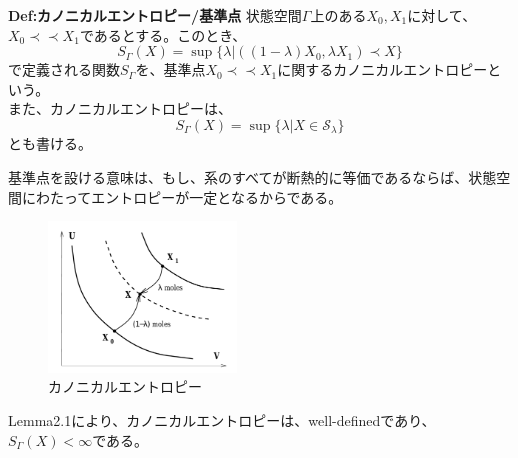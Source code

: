 \documentclass[a4paper,11pt]{jsarticle}
\begin{document}
\begin{itembox}[l]{\textbf{Def:カノニカルエントロピー/基準点}}
    状態空間$\Gamma$上のある$X_0,X_1$に対して、$X_0 \prec \prec X_1$であるとする。このとき、
    \begin{equation}
        S_{\Gamma}(X) = \sup\{\lambda|((1-\lambda)X_0,\lambda X_1) \prec X\}
    \end{equation}
    で定義される関数$S_{\Gamma}$を、基準点$X_0 \prec \prec X_1$に関するカノニカルエントロピーという。\\
    また、カノニカルエントロピーは、
    \begin{equation}
        S_{\Gamma}(X) = \sup\{\lambda|X \in \mathcal{S}_{\lambda}\}
    \end{equation}
    とも書ける。
\end{itembox}
基準点を設ける意味は、もし、系のすべてが断熱的に等価であるならば、状態空間にわたってエントロピーが一定となるからである。\\


\begin{figure}[H]
    \begin{center}
    \includegraphics[width=50mm]{fig2.png}
    \end{center}
    \caption{カノニカルエントロピー}
    \label{fig:one}
\end{figure}
Lemma2.1により、カノニカルエントロピーは、well-definedであり、$S_{\Gamma}(X)<\infty$である。\\
\end{document}
